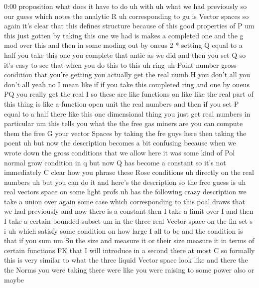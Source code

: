 \begin{unfinished}{0:00}
proposition  what  does  it  have  to  do  uh
with  uh  what  we  had  previously
so  our  guess  which  notes  the  analytic  R
uh  corresponding  to  gu  is  Vector
spaces  so  again  it's  clear  that  this
defines  structure  because  of  this  good
properties  of  P  um  this  just  gotten  by
taking  this  one  we  had
is
makes  a  completed
one  and  the  g  mod  over
this  and  then  in  some  moding  out  by
oneus  2
*  setting  Q  equal  to  a
half  you  take  this  one  you  complete  that
antic  as  we  did  and  then  you  set  Q
so  it's  easy  to  see  that  when  you  do
this  to  this  uh
ring
uh  Point  number  gross  condition  that
you're  getting  you  actually  get  the  real
numb  H  you  don't
all  you  don't
all  yeah  no  I  mean  like  if  if  you  take
this  completed  ring  and  one  by  oneus  PQ
you  really  get  the
real
I  so  these  are  like  functions  on  like
like  the  real  part  of  this  thing  is  like
a  function  open  unit  the  real  numbers
and  then  if  you  set  P  equal  to  a  half
there  like  this  one  dimensional  thing
you  just  get  real
numbers  in  particular  um  this  tells  you
what  the  the  free  gas  miners  are  you  can
compute  them  the  free  G  your  vector
Spaces  by  taking  the  fre  guys  here  then
taking  the
poent  uh  but  now  the  description  becomes
a  bit  confusing  because  when  we  wrote
down  the  gross  conditions  that  we  allow
here  it  was  some  kind  of  Pol  normal  grow
condition  in  q  but  now  Q  has  become  a
constant  so  it's  not  immediately  C  clear
how  you  phrase  these  Rose  conditions  uh
directly  on  the  real  numbers  uh  but  you
can  do  it  and  here's  the
description  so  the  free  guess  is  uh  real
vectors  space  on  some  light
profs  uh  has  the  following  crazy
description  we  take  a  union  over  again
some  case  which  corresponding  to  this
poal  draws  that  we  had  previously  and
now  there  is  a
constant  then  I  take  a  limit  over  I
and  then  I  take  a  certain  bounded
subset  um  in  the  three  real  Vector  space
on  the  fin  set  s
i  uh  which  satisfy  some  condition  on  how
large  I  all  to  be  and  the  condition  is
that  if  you
sum  um  Su  the  size  and  measure  it  or
their  size  measure  it  in  terms  of
certain  functions  FK  that  I  will
introduce  in  a  second  there  at  most
C
so  formally  this  is  very  similar  to  what
the  three  liquid  Vector  space  look  like
and  there  the  the  Norms  you  were  taking
there  were  like  you  were  raising  to  some
power  also  or  maybe

\end{unfinished}
